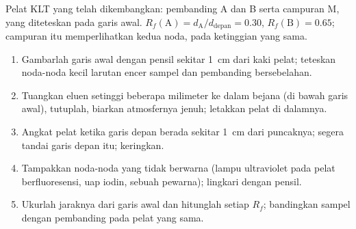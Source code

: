 \begin{omfigure}

{\small Pelat KLT yang telah dikembangkan: pembanding A dan B serta
campuran M, yang diteteskan pada garis awal. $R_f(\mathrm{A}) = d_{\mathrm{A}}/d_{\mathrm{depan}}
= 0.30$, $R_f(\mathrm{B}) = 0.65$; campuran itu memperlihatkan kedua noda,
pada ketinggian yang sama.}
\end{omfigure}

\begin{method}\label{met:b1:lab-techniques-1:tlc}
\begin{enumerate}
  \item Gambarlah garis awal dengan pensil sekitar \qty{1}{cm} dari kaki
        pelat; teteskan noda-noda kecil larutan encer sampel dan
        pembanding bersebelahan.
  \item Tuangkan eluen setinggi beberapa milimeter ke dalam bejana (di
        bawah garis awal), tutuplah, biarkan atmosfernya jenuh; letakkan
        pelat di dalamnya.
  \item Angkat pelat ketika garis depan berada sekitar \qty{1}{cm} dari
        puncaknya; segera tandai garis depan itu; keringkan.
  \item Tampakkan noda-noda yang tidak berwarna (lampu ultraviolet pada
        pelat berfluoresensi, uap iodin, sebuah pewarna); lingkari dengan
        pensil.
  \item Ukurlah jaraknya dari garis awal dan hitunglah setiap $R_f$;
        bandingkan sampel dengan pembanding pada pelat yang sama.
\end{enumerate}
\end{method}

